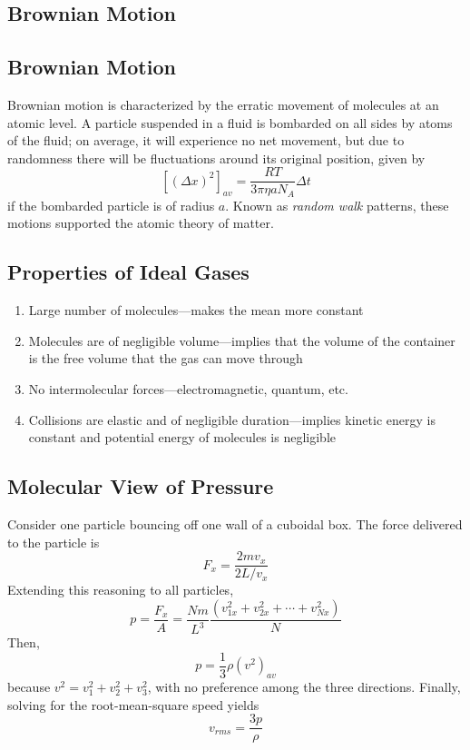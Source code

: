 \documentclass[../PhysicsFormulae.tex]{subfiles}
\begin{document}
\subsection{Brownian Motion}
\subsection{Brownian Motion}
Brownian motion is characterized by the erratic movement of molecules at an atomic level. A particle suspended in a fluid is bombarded on all sides by atoms of the fluid; on average, it will experience no net movement, but due to randomness there will be fluctuations around its original position, given by
\[ [(\Delta x)^2]_{av} = \frac{RT}{3\pi\eta aN_A}\Delta t \]
if the bombarded particle is of radius $a$. Known as \textit{random walk} patterns, these motions supported the atomic theory of matter. 

\subsection{Properties of Ideal Gases}
\begin{enumerate}
	\itemsep0em 
	\item Large number of molecules---makes the mean more constant
	\item Molecules are of negligible volume---implies that the volume of the container is the free volume that the gas can move through
	\item No intermolecular forces---electromagnetic, quantum, etc.
	\item Collisions are elastic and of negligible duration---implies kinetic energy is constant and potential energy of molecules is negligible
\end{enumerate}

\subsection{Molecular View of Pressure}
Consider one particle bouncing off one wall of a cuboidal box. The force delivered to the particle is 
\[ F_x = \frac{2mv_x}{2L/v_x} \]
Extending this reasoning to all particles, 
\[ p = \frac{F_x}{A} = \frac{Nm}{L^3}\frac{(v_{1x}^2 + v_{2x}^2 + \cdots + v_{Nx}^2)}{N} \]
Then,
\[ p = \frac{1}{3}\rho (v^2)_{av} \]
because $v^2 = v_1^2 + v_2^2 + v_3^2$, with no preference among the three directions. 
Finally, solving for the root-mean-square speed yields
\[ v_{rms} = \frac{3p}{\rho} \]
\end{document}
